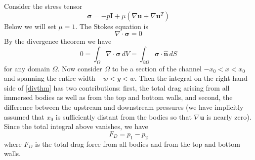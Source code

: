 \documentclass[11pt]{article}
\newcommand{\grad}{\nabla}
\newcommand{\bvec}[1]{\ensuremath{\boldsymbol{#1}}}
\newcommand {\bu} {\bvec{u}}
\newcommand{\nhat}{\hat{\bvec{n}}}
\newcommand{\pup}{p_{1}}
\newcommand{\pdn}{p_{2}}
\begin{document}
Consider the stress tensor
\begin{equation}
\bvec{\sigma} = -p \bvec{I} + \mu \left( \grad \bu + \grad \bu^T \right)
\end{equation}
Below we will set $\mu=1$. The Stokes equation is
\begin{equation}
\grad \cdot \bvec{\sigma} = 0
\end{equation}
By the divergence theorem we have
\begin{equation}
\label{divthm}
0 = \int_{\Omega} \grad \cdot \bvec{\sigma} \, dV 
= \int_{\partial \Omega} \bvec{\sigma} \cdot \nhat \, dS
\end{equation}
for any domain $\Omega$. Now consider $\Omega$ to be a section of the channel $-x_0 < x < x_0$ and spanning the entire width $-w < y < w$. Then the integral on the right-hand-side of \eqref{divthm} has two contributions: first, the total drag arising from all immersed bodies as well as from the top and bottom walls, and second, the difference between the upstream and downstream pressures (we have implicitly assumed that $x_0$ is sufficiently distant from the bodies so that $\grad \bvec{u}$ is nearly zero). Since the total integral above vanishes, we have
\begin{equation}
F_D = \pup - \pdn
\end{equation}
where $F_D$ is the total drag force from all bodies and from the top and bottom walls.
\end{document}
